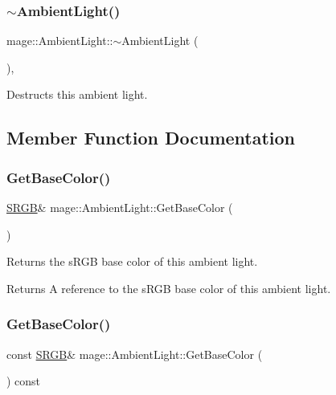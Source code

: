 \subsubsection{\texorpdfstring{$\sim$\+Ambient\+Light()}{~AmbientLight()}}
{\footnotesize\ttfamily mage\+::\+Ambient\+Light\+::$\sim$\+Ambient\+Light (\begin{DoxyParamCaption}{ }\end{DoxyParamCaption})\hspace{0.3cm}{\ttfamily [virtual]}, {\ttfamily [default]}}

Destructs this ambient light. 

\subsection{Member Function Documentation}
\hypertarget{classmage_1_1_ambient_light_a552a1d80d3032e6b93b6bc6e596d2ec5}{}\label{classmage_1_1_ambient_light_a552a1d80d3032e6b93b6bc6e596d2ec5} 
\subsubsection{\texorpdfstring{Get\+Base\+Color()}{GetBaseColor()}\hspace{0.1cm}{\footnotesize\ttfamily [1/2]}}
{\footnotesize\ttfamily \hyperlink{structmage_1_1_s_r_g_b}{S\+R\+GB}\& mage\+::\+Ambient\+Light\+::\+Get\+Base\+Color (\begin{DoxyParamCaption}{ }\end{DoxyParamCaption})\hspace{0.3cm}{\ttfamily [noexcept]}}

Returns the s\+R\+GB base color of this ambient light.

\begin{DoxyReturn}{Returns}
A reference to the s\+R\+GB base color of this ambient light. 
\end{DoxyReturn}
\hypertarget{classmage_1_1_ambient_light_a65ed6d502514a63d545075ba4eb23b91}{}\label{classmage_1_1_ambient_light_a65ed6d502514a63d545075ba4eb23b91} 
\subsubsection{\texorpdfstring{Get\+Base\+Color()}{GetBaseColor()}\hspace{0.1cm}{\footnotesize\ttfamily [2/2]}}
{\footnotesize\ttfamily const \hyperlink{structmage_1_1_s_r_g_b}{S\+R\+GB}\& mage\+::\+Ambient\+Light\+::\+Get\+Base\+Color (\begin{DoxyParamCaption}{ }\end{DoxyParamCaption}) const\hspace{0.3cm}{\ttfamily [noexcept]}}

